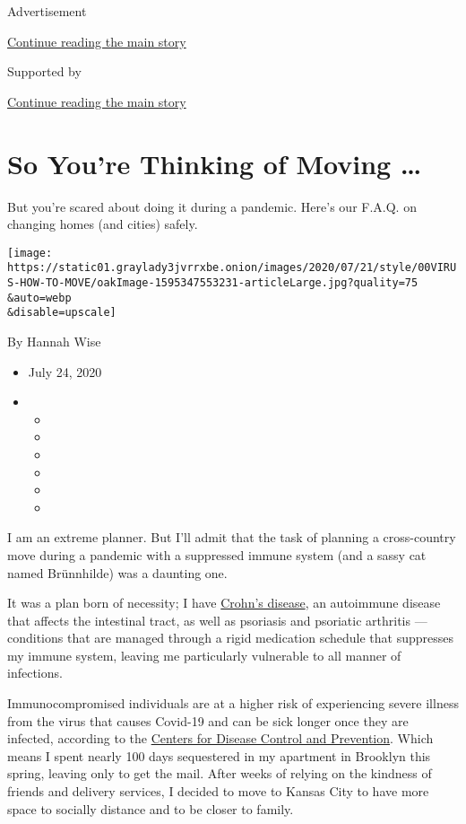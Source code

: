 Advertisement

\protect\hyperlink{after-top}{Continue reading the main story}

Supported by

\protect\hyperlink{after-sponsor}{Continue reading the main story}

\hypertarget{so-youre-thinking-of-moving-}{%
\section{So You're Thinking of Moving
\ldots{}}\label{so-youre-thinking-of-moving-}}

But you're scared about doing it during a pandemic. Here's our F.A.Q. on
changing homes (and cities) safely.

\texttt{[image: https://static01.graylady3jvrrxbe.onion/images/2020/07/21/style/00VIRUS-HOW-TO-MOVE/oakImage-1595347553231-articleLarge.jpg?quality=75\\\&auto=webp\\\&disable=upscale]}

By Hannah Wise

\begin{itemize}
\item
  July 24, 2020
\item
  \begin{itemize}
  \item
  \item
  \item
  \item
  \item
  \item
  \end{itemize}
\end{itemize}

I am an extreme planner. But I'll admit that the task of planning a
cross-country move during a pandemic with a suppressed immune system
(and a sassy cat named Brünnhilde) was a daunting one.

It was a plan born of necessity; I have
\href{https://www.dallasnews.com/news/healthy-living/2016/05/10/how-a-diagnosis-of-crohn-s-disease-changed-me-at-23/}{Crohn's
disease}, an autoimmune disease that affects the intestinal tract, as
well as psoriasis and psoriatic arthritis --- conditions that are
managed through a rigid medication schedule that suppresses my immune
system, leaving me particularly vulnerable to all manner of infections.

Immunocompromised individuals are at a higher risk of experiencing
severe illness from the virus that causes Covid-19 and can be sick
longer once they are infected, according to the
\href{https://www.cdc.gov/coronavirus/2019-ncov/need-extra-precautions/immunocompromised.html}{Centers
for Disease Control and Prevention}. Which means I spent nearly 100 days
sequestered in my apartment in Brooklyn this spring, leaving only to get
the mail. After weeks of relying on the kindness of friends and delivery
services, I decided to move to Kansas City to have more space to
socially distance and to be closer to family.


